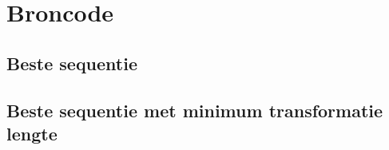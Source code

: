 \chapter{Broncode}
\label{app:broncode}

\section{Beste sequentie}
\label{Broncode:algo1}


\section{Beste sequentie met minimum transformatie lengte}
\label{Broncode:algo2}


